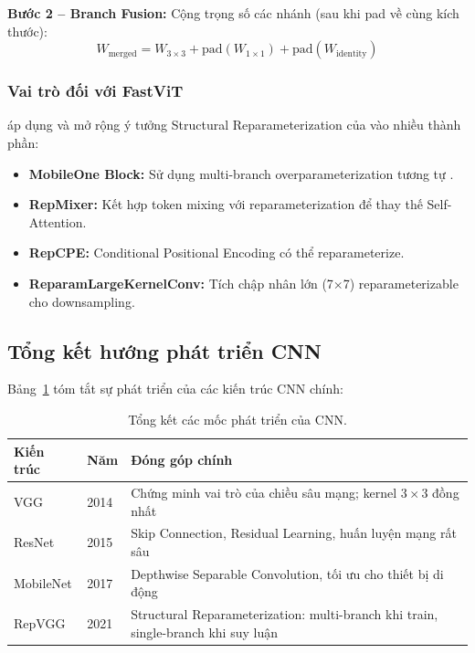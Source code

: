 \textbf{Bước 2 -- Branch Fusion:} Cộng trọng số các nhánh (sau khi pad về cùng kích thước):
\begin{equation}
    W_{\text{merged}} = W_{3\times3} + \text{pad}(W_{1\times1}) + \text{pad}(W_{\text{identity}})
    \label{eq:branch_fusion}
\end{equation}

\subsubsection*{Vai trò đối với FastViT}

\fastvit{} áp dụng và mở rộng ý tưởng Structural Reparameterization của \repvgg{} vào nhiều thành phần:
\begin{itemize}
    \item \textbf{MobileOne Block:} Sử dụng multi-branch overparameterization tương tự \repvgg{}.
    \item \textbf{RepMixer:} Kết hợp token mixing với reparameterization để thay thế Self-Attention.
    \item \textbf{RepCPE:} Conditional Positional Encoding có thể reparameterize.
    \item \textbf{ReparamLargeKernelConv:} Tích chập nhân lớn (7$\times$7) reparameterizable cho downsampling.
\end{itemize}

\subsection{Tổng kết hướng phát triển CNN}
\label{subsec:cnn_summary}

Bảng~\ref{tab:cnn_evolution} tóm tắt sự phát triển của các kiến trúc CNN chính:

\begin{table}[H]
\centering
\caption{Tổng kết các mốc phát triển của CNN.}
\label{tab:cnn_evolution}
\begin{tabularx}{\textwidth}{l l X}
\toprule
\textbf{Kiến trúc} & \textbf{Năm} & \textbf{Đóng góp chính} \\
\midrule
VGG & 2014 & Chứng minh vai trò của chiều sâu mạng; kernel $3 \times 3$ đồng nhất \\
ResNet & 2015 & Skip Connection, Residual Learning, huấn luyện mạng rất sâu \\
MobileNet & 2017 & Depthwise Separable Convolution, tối ưu cho thiết bị di động \\
RepVGG & 2021 & Structural Reparameterization: multi-branch khi train, single-branch khi suy luận \\
\bottomrule
\end{tabularx}
\end{table}

